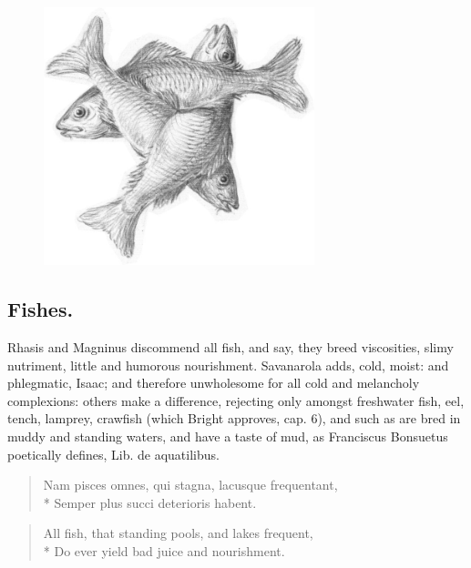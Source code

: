 {\begin{figure}[H]
  \centering
  \includegraphics[keepaspectratio,width=0.7\textwidth]{figures/Three-fishes-arranged-crosswise-small.jpg}
  \caption{}
  \label{fig:threefishes}
\end{figure}

\subsection{Fishes.}
Rhasis and Magninus discommend all fish, and say, they
breed viscosities, slimy nutriment, little and humorous nourishment.
Savanarola adds, cold, moist: and phlegmatic, Isaac; and therefore
unwholesome for all cold and melancholy complexions: others make a
difference, rejecting only amongst freshwater fish, eel, tench,
lamprey, crawfish (which Bright approves, cap. 6), and such as are bred
in muddy and standing waters, and have a taste of mud, as Franciscus
Bonsuetus poetically defines, Lib. de aquatilibus.

\begin{latin}
\begin{verse}
Nam pisces omnes, qui stagna, lacusque frequentant,\\*
Semper plus succi deterioris habent.
\end{verse}
\end{latin}

\begin{verse}
All fish, that standing pools, and lakes frequent,\\*
Do ever yield bad juice and nourishment.
\end{verse}

}
